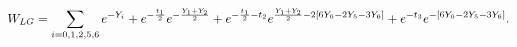 \begin{equation}
W_{LG}=\sum_{i=0,1,2,5,6}e^{-Y_i}+e^{-{t_1\over2}}e^{-{Y_1+Y_2\over2}}
+e^{-{t_1\over2}-t_2}e^{{Y_1+Y_2\over2}-2[6Y_0-2Y_5-3Y_6]}+e^{-t_3}e^{-[6Y_0-2Y_5-3Y_6]}.
\end{equation}


